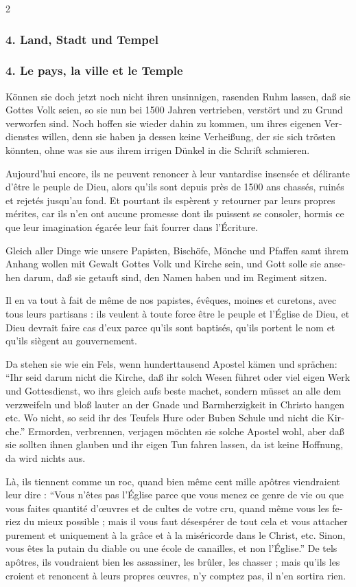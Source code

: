 \documentclass[a4paper,12pt]{article}
\newcommand\chunks[2]{%
\begin{leftcolumn*}\begin{otherlanguage}{german}%
{#1}%
\end{otherlanguage}\end{leftcolumn*}%
\begin{rightcolumn}\begin{otherlanguage}{french}%
{#2}%
\end{otherlanguage}\end{rightcolumn}%
}
\begin{document}
\begin{paracol}{2}
         {\textelp{}}
  \chunks{\subsubsection*{4. Land, Stadt und Tempel}}
         {\subsubsection*{4. Le pays, la ville et le Temple}}
  \chunks{Können sie doch jetzt noch nicht ihren unsinnigen, rasenden Ruhm lassen, daß sie Gottes Volk seien, so sie nun bei 1500 Jahren vertrieben, verstört und zu Grund verworfen sind. Noch hoffen sie wieder dahin zu kommen, um ihres eigenen Verdienstes willen, denn sie haben ja dessen keine Verheißung, der sie sich trösten könnten, ohne was sie aus ihrem irrigen Dünkel in die Schrift schmieren.}
         {Aujourd’hui encore, ils ne peuvent renoncer à leur vantardise insensée et délirante d’être le peuple de Dieu, alors qu’ils sont depuis près de 1500 ans chassés, ruinés et rejetés jusqu’au fond. Et pourtant ils espèrent y retourner par leurs propres mérites, car ils n’en ont aucune promesse dont ils puissent se consoler, hormis ce que leur imagination égarée leur fait fourrer dans l’Écriture.}
  \chunks{\textelp{}}
         {\textelp{}}
  \chunks{Gleich aller Dinge wie unsere Papisten, Bischöfe, Mönche und Pfaffen samt ihrem Anhang wollen mit Gewalt Gottes Volk und Kirche sein, und Gott solle sie ansehen darum, daß sie getauft sind, den Namen haben und im Regiment sitzen.}
         {Il en va tout à fait de même de nos papistes, évêques, moines et curetons, avec tous leurs partisans : ils veulent à toute force être le peuple et l’Église de Dieu, et Dieu devrait faire cas d’eux parce qu’ils sont baptisés, qu’ils portent le nom et qu’ils siègent au gouvernement.}
  \chunks{Da stehen sie wie ein Fels, wenn hunderttausend Apostel kämen und sprächen: \enquote{Ihr seid darum nicht die Kirche, daß ihr solch Wesen führet oder viel eigen Werk und Gottesdienst, wo ihrs gleich aufs beste machet, sondern müsset an alle dem verzweifeln und bloß lauter an der Gnade und Barmherzigkeit in Christo hangen etc. Wo nicht, so seid ihr des Teufels Hure oder Buben Schule und nicht die Kirche.} Ermorden, verbrennen, verjagen möchten sie solche Apostel wohl, aber daß sie sollten ihnen glauben und ihr eigen Tun fahren lassen, da ist keine Hoffnung, da wird nichts aus.}
         {Là, ils tiennent comme un roc, quand bien même cent mille apôtres viendraient leur dire : \enquote{Vous n’êtes pas l’Église parce que vous menez ce genre de vie ou que vous faites quantité d’œuvres et de cultes de votre cru, quand même vous les feriez du mieux possible ; mais il vous faut désespérer de tout cela et vous attacher purement et uniquement à la grâce et à la miséricorde dans le Christ, etc. Sinon, vous êtes la putain du diable ou une école de canailles, et non l’Église.} De tels apôtres, ils voudraient bien les assassiner, les brûler, les chasser ; mais qu’ils les croient et renoncent à leurs propres œuvres, n’y comptez pas, il n’en sortira rien.}

\end{paracol}
\end{document}

